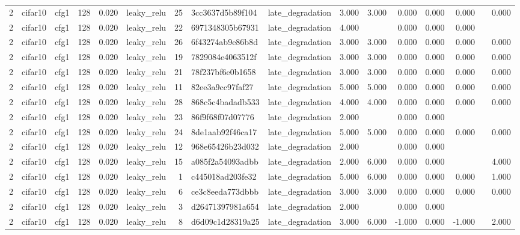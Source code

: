 \begin{table}[htbp]
{\begin{tabular}{@{}rllrrlrllrrrrrrr@{}}
2 & cifar10 & cfg1 & 128 & 0.020 & leaky\_relu & 25 & 3cc3637d5b89f104 & late\_degradation & 3.000 & 3.000 & 0.000 & 0.000 & 0.000 &  & 0.000 \\
2 & cifar10 & cfg1 & 128 & 0.020 & leaky\_relu & 22 & 6971348305b67931 & late\_degradation & 4.000 &  & 0.000 & 0.000 & 0.000 &  &  \\
2 & cifar10 & cfg1 & 128 & 0.020 & leaky\_relu & 26 & 6f43274ab9e86b8d & late\_degradation & 3.000 & 3.000 & 0.000 & 0.000 & 0.000 &  & 0.000 \\
2 & cifar10 & cfg1 & 128 & 0.020 & leaky\_relu & 19 & 7829084e4063512f & late\_degradation & 3.000 & 3.000 & 0.000 & 0.000 & 0.000 &  & 0.000 \\
2 & cifar10 & cfg1 & 128 & 0.020 & leaky\_relu & 21 & 78f237bf6e0b1658 & late\_degradation & 3.000 & 3.000 & 0.000 & 0.000 & 0.000 &  & 0.000 \\
2 & cifar10 & cfg1 & 128 & 0.020 & leaky\_relu & 11 & 82ee3a9cc97faf27 & late\_degradation & 5.000 & 5.000 & 0.000 & 0.000 & 0.000 &  & 0.000 \\
2 & cifar10 & cfg1 & 128 & 0.020 & leaky\_relu & 28 & 868c5c4badadb533 & late\_degradation & 4.000 & 4.000 & 0.000 & 0.000 & 0.000 &  & 0.000 \\
2 & cifar10 & cfg1 & 128 & 0.020 & leaky\_relu & 23 & 86f9f68f07d07776 & late\_degradation & 2.000 &  & 0.000 & 0.000 &  &  &  \\
2 & cifar10 & cfg1 & 128 & 0.020 & leaky\_relu & 24 & 8de1aab92f46ca17 & late\_degradation & 5.000 & 5.000 & 0.000 & 0.000 & 0.000 &  & 0.000 \\
2 & cifar10 & cfg1 & 128 & 0.020 & leaky\_relu & 12 & 968e65426b23d032 & late\_degradation & 2.000 &  & 0.000 & 0.000 &  &  &  \\
2 & cifar10 & cfg1 & 128 & 0.020 & leaky\_relu & 15 & a085f2a54093adbb & late\_degradation & 2.000 & 6.000 & 0.000 & 0.000 &  &  & 4.000 \\
2 & cifar10 & cfg1 & 128 & 0.020 & leaky\_relu & 1 & c445018ad203fe32 & late\_degradation & 5.000 & 6.000 & 0.000 & 0.000 & 0.000 &  & 1.000 \\
2 & cifar10 & cfg1 & 128 & 0.020 & leaky\_relu & 6 & ce3c8eeda773dbbb & late\_degradation & 3.000 & 3.000 & 0.000 & 0.000 & 0.000 &  & 0.000 \\
2 & cifar10 & cfg1 & 128 & 0.020 & leaky\_relu & 3 & d26471397981a654 & late\_degradation & 2.000 &  & 0.000 & 0.000 &  &  &  \\
2 & cifar10 & cfg1 & 128 & 0.020 & leaky\_relu & 8 & d6d09c1d28319a25 & late\_degradation & 3.000 & 6.000 & -1.000 & 0.000 & -1.000 &  & 2.000 \\

\end{tabular}}
\end{table}

